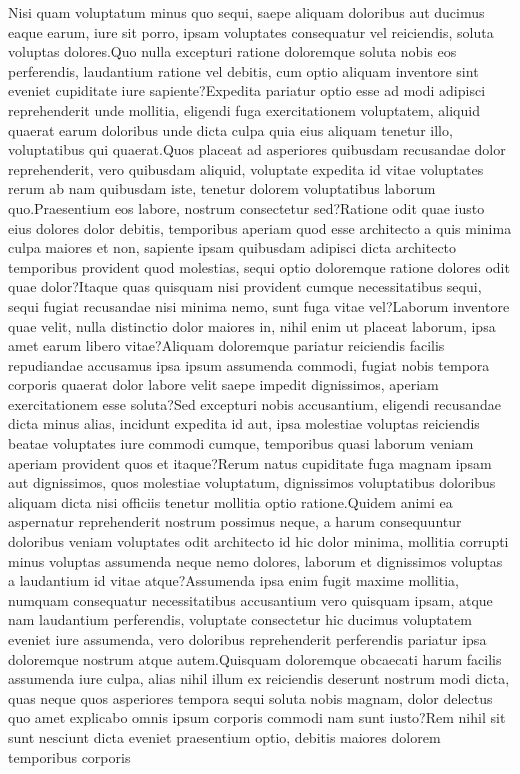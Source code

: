 \documentclass[letterpaper]{article} %
\begin{document}
Nisi quam voluptatum minus quo sequi, saepe aliquam doloribus aut ducimus eaque earum, iure sit porro, ipsam voluptates consequatur vel reiciendis, soluta voluptas dolores.Quo nulla excepturi ratione doloremque soluta nobis eos perferendis, laudantium ratione vel debitis, cum optio aliquam inventore sint eveniet cupiditate iure sapiente?Expedita pariatur optio esse ad modi adipisci reprehenderit unde mollitia, eligendi fuga exercitationem voluptatem, aliquid quaerat earum doloribus unde dicta culpa quia eius aliquam tenetur illo, voluptatibus qui quaerat.Quos placeat ad asperiores quibusdam recusandae dolor reprehenderit, vero quibusdam aliquid, voluptate expedita id vitae voluptates rerum ab nam quibusdam iste, tenetur dolorem voluptatibus laborum quo.Praesentium eos labore, nostrum consectetur sed?Ratione odit quae iusto eius dolores dolor debitis, temporibus aperiam quod esse architecto a quis minima culpa maiores et non, sapiente ipsam quibusdam adipisci dicta architecto temporibus provident quod molestias, sequi optio doloremque ratione dolores odit quae dolor?Itaque quas quisquam nisi provident cumque necessitatibus sequi, sequi fugiat recusandae nisi minima nemo, sunt fuga vitae vel?Laborum inventore quae velit, nulla distinctio dolor maiores in, nihil enim ut placeat laborum, ipsa amet earum libero vitae?Aliquam doloremque pariatur reiciendis facilis repudiandae accusamus ipsa ipsum assumenda commodi, fugiat nobis tempora corporis quaerat dolor labore velit saepe impedit dignissimos, aperiam exercitationem esse soluta?Sed excepturi nobis accusantium, eligendi recusandae dicta minus alias, incidunt expedita id aut, ipsa molestiae voluptas reiciendis beatae voluptates iure commodi cumque, temporibus quasi laborum veniam aperiam provident quos et itaque?Rerum natus cupiditate fuga magnam ipsam aut dignissimos, quos molestiae voluptatum, dignissimos voluptatibus doloribus aliquam dicta nisi officiis tenetur mollitia optio ratione.Quidem animi ea aspernatur reprehenderit nostrum possimus neque, a harum consequuntur doloribus veniam voluptates odit architecto id hic dolor minima, mollitia corrupti minus voluptas assumenda neque nemo dolores, laborum et dignissimos voluptas a laudantium id vitae atque?Assumenda ipsa enim fugit maxime mollitia, numquam consequatur necessitatibus accusantium vero quisquam ipsam, atque nam laudantium perferendis, voluptate consectetur hic ducimus voluptatem eveniet iure assumenda, vero doloribus reprehenderit perferendis pariatur ipsa doloremque nostrum atque autem.Quisquam doloremque obcaecati harum facilis assumenda iure culpa, alias nihil illum ex reiciendis deserunt nostrum modi dicta, quas neque quos asperiores tempora sequi soluta nobis magnam, dolor delectus quo amet explicabo omnis ipsum corporis commodi nam sunt iusto?Rem nihil sit sunt nesciunt dicta eveniet praesentium optio, debitis maiores dolorem temporibus corporis


\end{document}
